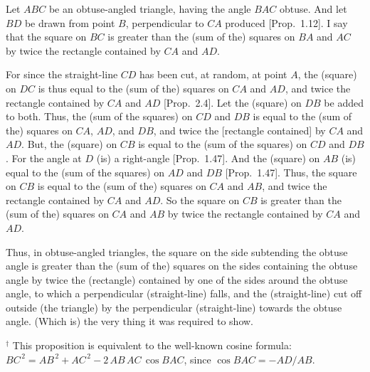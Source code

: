 \begin{Parallel}{}{}
{ Let $ABC$ be an obtuse-angled triangle, having the 
 angle $BAC$ obtuse. And let $BD$ be drawn from point $B$, perpendicular
 to $CA$ produced [Prop.~1.12]. I say that the square on $BC$ is greater than the
 (sum of the) squares on $BA$ and $AC$ by twice the rectangle contained
 by $CA$ and $AD$.
  
\epsfysize=1.8in
\centerline{}

 For since the straight-line $CD$ has been cut, at random, at point $A$, 
 the (square) on $DC$ is thus equal to the (sum of the) squares on $CA$ and $AD$,
 and twice the rectangle contained by $CA$ and $AD$ [Prop.~2.4]. Let
 the (square) on $DB$ be added to both. Thus, the
 (sum of the squares) on $CD$ and $DB$ is equal to the (sum of the) squares
 on $CA$, $AD$, and $DB$, and twice the [rectangle contained] by $CA$ and $AD$.
 But, the (square) on
 $CB$ is equal to the (sum of the squares) on $CD$ and $DB$. For the angle at $D$ (is) a right-angle [Prop.~1.47]. And  the (square) on 
 $AB$ (is) equal to the (sum of the
 squares) on $AD$ and $DB$  [Prop.~1.47]. Thus, the square on $CB$ is equal to the (sum of the)
 squares on $CA$ and $AB$, and twice the rectangle contained by $CA$ and $AD$.  So the square on $CB$ is greater than the (sum of the) squares on $CA$ and
 $AB$ by twice the rectangle contained by $CA$ and $AD$.
 
Thus, in  obtuse-angled triangles, the square on the side subtending the obtuse
angle is greater than the (sum of the) squares on the sides containing the obtuse angle
by twice the (rectangle) contained by one of the sides around the obtuse
angle, to which a perpendicular (straight-line) falls, and the 
 (straight-line) cut off outside (the triangle)
 by the perpendicular (straight-line) towards the obtuse angle.
 (Which is) the very thing it was required to show.}
\end{Parallel}
{\footnotesize \noindent$^\dag$ This proposition is equivalent
to the well-known cosine formula: $BC^{\,2} = AB^{\,2} + AC^{\,2} -2\,AB\,AC\,\cos BAC$, since $\cos BAC = - AD / AB$.}


